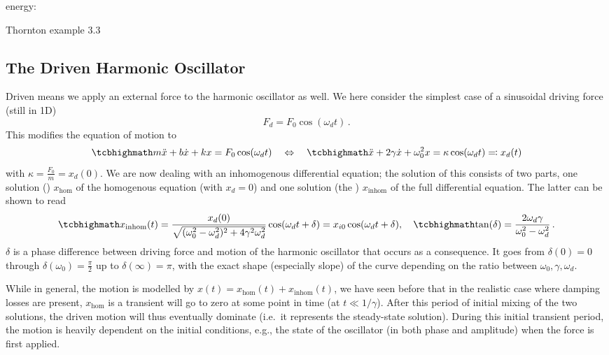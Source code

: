 \documentclass[../class_mech_main.tex]{subfiles}
\begin{document}
energy:



\begin{ex}
	Thornton example 3.3
\end{ex}



		\subsection{The Driven Harmonic Oscillator}
Driven means we apply an external force to the harmonic oscillator as well. We here consider the simplest case of a sinusoidal driving force (still in 1D)
\begin{equation}
	F_d = F_0 \cos(\omega_d t) \, .
\end{equation}
This modifies the equation of motion to
\begin{equation}
	\eqbox{
		m \ddot{x} + b \dot{x} + k x = F_0 \cos(\omega_d t)
	}
	\quad \Leftrightarrow \quad
	\eqbox{
		\ddot{x} + 2 \gamma \dot{x} + \omega_0^2 x = \kappa \cos(\omega_d t) \eqqcolon x_d(t)
	}
\end{equation}
with $\kappa = \frac{F_0}{m} = x_d(0)$. We are now dealing with an inhomogenous differential equation; the solution of this consists of two parts, one solution () $x_\mathrm{hom}$ of the homogenous equation (with $x_d = 0$) and one solution (the ) $x_\mathrm{inhom}$ of the full differential equation. The latter can be shown to read
\begin{equation}\label{eq:driven_harm_osc_params}
	\eqbox{
		x_\mathrm{inhom}(t) = \frac{x_d(0)}{\sqrt{(\omega_0^2 - \omega_d^2)^2 + 4 \gamma^2 \omega_d^2}} \cos(\omega_d t + \delta) = x_{i0} \cos(\omega_d t + \delta)
	}, \quad
	\eqbox{
		\tan(\delta) = \frac{2 \omega_d \gamma}{\omega_0^2 - \omega_d^2}
	} \, .
\end{equation}
$\delta$ is a phase difference between driving force and motion of the harmonic oscillator that occurs as a consequence. It goes from $\delta(0) = 0$ through $\delta(\omega_0) = \frac{\pi}{2}$ up to $\delta(\infty) = \pi$, with the exact shape (especially slope) of the curve depending on the ratio between $\omega_0, \gamma, \omega_d$.

While in general, the motion is modelled by $x(t) = x_\mathrm{hom}(t) + x_\mathrm{inhom}(t)$, we have seen before that in the realistic case where damping losses are present, $x_\mathrm{hom}$ is a transient will go to zero at some point in time (at $t \ll 1/\gamma$). After this period of initial mixing of the two solutions, the driven motion will thus eventually dominate (i.e.~it represents the steady-state solution). During this initial transient period, the motion is heavily dependent on the initial conditions, e.g., the state of the oscillator (in both phase and amplitude) when the force is first applied.
\end{document}
